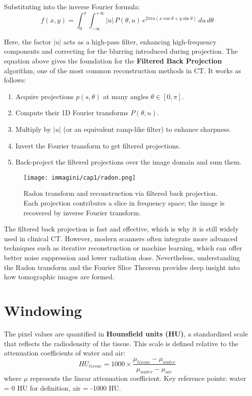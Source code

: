 Substituting into the inverse Fourier formula:
\[
f(x, y) = \int_{0}^{\pi} \int_{-\infty}^{+\infty} |u|\, P(\theta, u)\, e^{2\pi i u (x \cos\theta + y \sin\theta)}\, du\, d\theta
\]

Here, the factor \( |u| \) acts as a high-pass filter, enhancing high-frequency components and correcting for the blurring introduced during projection.
The equation above gives the foundation for the \textbf{Filtered Back Projection} algorithm, one of the most common reconstruction methods in CT. It works as follows:
\begin{enumerate}
    \item Acquire projections \( p(s, \theta) \) at many angles \( \theta \in [0, \pi] \).
    \item Compute their 1D Fourier transforms \( P(\theta, u) \).
    \item Multiply by \( |u| \) (or an equivalent ramp-like filter) to enhance sharpness.
    \item Invert the Fourier transform to get filtered projections.
    \item Back-project the filtered projections over the image domain and sum them.
\end{enumerate}

\begin{figure}[h!]
    \centering
    \texttt{[image: immagini/cap1/radon.png]}
    \caption{Radon transform and reconstruction via filtered back projection. Each projection contributes a slice in frequency space; the image is recovered by inverse Fourier transform.}
    \label{fig:radon_transform}
\end{figure}

The filtered back projection is fast and effective, which is why it is still widely used in clinical CT. However, modern scanners often integrate more advanced techniques such as iterative reconstruction or machine learning, which can offer better noise suppression and lower radiation dose. Nevertheless, understanding the Radon transform and the Fourier Slice Theorem provides deep insight into how tomographic images are formed.


\section{Windowing}

The pixel values are quantified in \textbf{Hounsfield units (HU)}, a standardized scale that reflects the radiodensity of the tissue. This scale is defined relative to the attenuation coefficients of water and air:
\begin{equation}
    HU_{tissue} = 1000 \times \dfrac{\mu_{tissue} - \mu_{water}}{\mu_{water}-\mu_{air}}
\end{equation}
where $\mu$ represents the linear attenuation coefficient. Key reference points: water = 0 HU for definition, air = -1000 HU. \\

